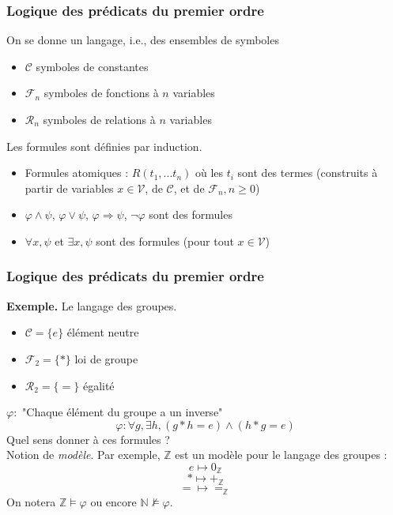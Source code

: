 \documentclass{beamer}
\newcommand{\itemz}{\item[$\triangleright$]}
\begin{document}
\begin{frame}
\frametitle{Logique des prédicats du premier ordre}
On se donne un langage, i.e., des ensembles de symboles \pause
\begin{itemize}
\itemz $\mathcal{C}$ symboles de constantes
\pause
\itemz $\mathcal{F}_n$ symboles de fonctions à $n$ variables
\pause
\itemz $\mathcal{R}_n$ symboles de relations à $n$ variables
\end{itemize}
\pause
Les formules sont définies par induction. \pause
\begin{itemize}
\itemz Formules atomiques : $R(t_1,...t_n)$ où les $t_i$ sont des termes (construits à partir de variables $x \in \mathcal{V}$, de $\mathcal{C}$, et de $\mathcal{F}_n, n \geq 0$)
\pause
\itemz $\varphi \wedge \psi$, $\varphi \vee \psi$, $\varphi \Rightarrow \psi$, $\neg \varphi$ sont des formules
\pause
\itemz $\forall x, \psi$ et $\exists x, \psi$ sont des formules (pour tout $x \in \mathcal{V}$)
\end{itemize}
\end{frame}

\begin{frame}
\frametitle{Logique des prédicats du premier ordre}
\textbf{Exemple.} Le langage des groupes.
\begin{itemize} 
\itemz $\mathcal{C} = \{ e \}$ élément neutre
\itemz $\mathcal{F}_2 = \{ * \}$ loi de groupe
\itemz $\mathcal{R}_2 = \{ = \}$ égalité
\end{itemize}
\pause
$\varphi : $ "Chaque élément du groupe a un inverse"
\pause
\[ \varphi : \forall g, \exists h, (g * h = e) \wedge (h * g = e) \]
\pause
Quel sens donner à ces formules ? \pause \\
Notion de \textit{modèle}. \pause
Par exemple, $\mathbb{Z}$ est un modèle pour le langage des groupes : 
\[ e \mapsto 0_\mathbb{Z} \]
\[ * \mapsto +_\mathbb{Z} \]
\[ = \mapsto =_\mathbb{Z} \]
On notera $\mathbb{Z} \models \varphi$ ou encore $\mathbb{N} \not\models \varphi$.

\end{frame}
\end{document}
